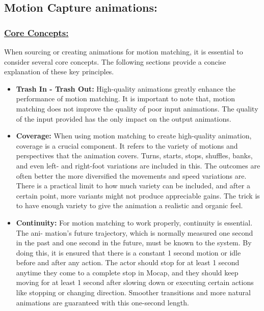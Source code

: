 \documentclass[12pt]{book}
\begin{document}
\subsection{Motion Capture animations:}
\subsubsection{\underline{\textbf{Core Concepts:}}}
When sourcing or creating animations for motion matching, it is essential to consider several
core concepts. The following sections provide a concise explanation of these key principles.
\begin{itemize}
    \item \textbf{Trash In - Trash Out: }High-quality animations greatly enhance the performance of
          motion matching. It is important to note that, motion matching does not improve the quality of poor input animations. The quality of the input provided has the only impact
          on the output animations.
    \item \textbf{Coverage: }When using motion matching to create high-quality animation, coverage is a
          crucial component. It refers to the variety of motions and perspectives that the animation
          covers. Turns, starts, stops, shuffles, banks, and even left- and right-foot variations are
          included in this. The outcomes are often better the more diversified the movements and
          speed variations are. There is a practical limit to how much variety can be included, and
          after a certain point, more variants might not produce appreciable gains. The trick is to
          have enough variety to give the animation a realistic and organic feel.
    \item \textbf{Continuity: }For motion matching to work properly, continuity is essential. The ani-
          mation’s future trajectory, which is normally measured one second in the past and one
          second in the future, must be known to the system. By doing this, it is ensured that there
          is a constant 1 second motion or idle before and after any action.
          The actor should stop for at least 1 second anytime they come to a complete stop in
          Mocap, and they should keep moving for at least 1 second after slowing down or executing
          certain actions like stopping or changing direction. Smoother transitions and more natural
          animations are guaranteed with this one-second length.
\end{itemize}
\end{document}
